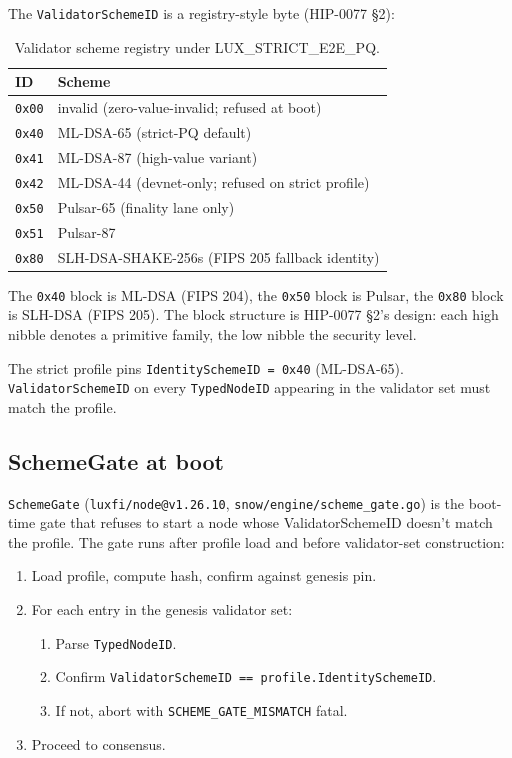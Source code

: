 The \texttt{ValidatorSchemeID} is a registry-style byte (HIP-0077 §2):

\begin{table}[H]
\centering
\caption{Validator scheme registry under LUX\_STRICT\_E2E\_PQ.}
\label{tab:validator-schemes}
\begin{tabular}{ll}
\toprule
ID & Scheme \\
\midrule
\texttt{0x00} & invalid (zero-value-invalid; refused at boot) \\
\texttt{0x40} & ML-DSA-65 (strict-PQ default) \\
\texttt{0x41} & ML-DSA-87 (high-value variant) \\
\texttt{0x42} & ML-DSA-44 (devnet-only; refused on strict profile) \\
\texttt{0x50} & Pulsar-65 (finality lane only) \\
\texttt{0x51} & Pulsar-87 \\
\texttt{0x80} & SLH-DSA-SHAKE-256s (FIPS 205 fallback identity) \\
\bottomrule
\end{tabular}
\end{table}

The \texttt{0x40} block is ML-DSA (FIPS 204), the \texttt{0x50} block is
Pulsar, the \texttt{0x80} block is SLH-DSA (FIPS 205). The block
structure is HIP-0077 §2's design: each high nibble denotes a primitive
family, the low nibble the security level.

The strict profile pins \texttt{IdentitySchemeID = 0x40}
(ML-DSA-65). \texttt{ValidatorSchemeID} on every \texttt{TypedNodeID}
appearing in the validator set must match the profile.

\subsection{SchemeGate at boot}

\texttt{SchemeGate} (\texttt{luxfi/node@v1.26.10},
\texttt{snow/engine/scheme\_gate.go}) is the boot-time gate that refuses
to start a node whose ValidatorSchemeID doesn't match the profile. The
gate runs after profile load and before validator-set construction:

\begin{enumerate}[leftmargin=2em,nosep]
  \item Load profile, compute hash, confirm against genesis pin.
  \item For each entry in the genesis validator set:
    \begin{enumerate}[leftmargin=2em,nosep,label=\alph*.]
      \item Parse \texttt{TypedNodeID}.
      \item Confirm \texttt{ValidatorSchemeID == profile.IdentitySchemeID}.
      \item If not, abort with \texttt{SCHEME\_GATE\_MISMATCH} fatal.
    \end{enumerate}
  \item Proceed to consensus.
\end{enumerate}

